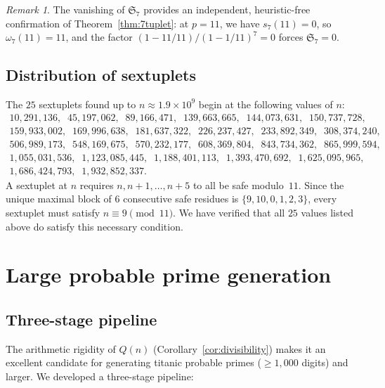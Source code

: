 \documentclass[11pt,a4paper]{article}
\theoremstyle{plain}
\theoremstyle{definition}
\theoremstyle{remark}
\newtheorem{remark}[theorem]{Remark}
\begin{document}
\begin{remark}
The vanishing of $\mathfrak{S}_7$ provides an independent, heuristic-free confirmation of Theorem~\ref{thm:7tuplet}: at $p = 11$, we have $s_7(11) = 0$, so $\omega_7(11) = 11$, and the factor $(1 - 11/11)/(1 - 1/11)^7 = 0$ forces $\mathfrak{S}_7 = 0$.
\end{remark}


\subsection{Distribution of sextuplets}

The $25$ sextuplets found up to $n \approx 1.9 \times 10^9$ begin at the following values of $n$:
\begin{gather*}
10{,}291{,}136,\;\; 45{,}197{,}062,\;\; 89{,}166{,}471,\;\; 139{,}663{,}665,\;\; 144{,}073{,}631,\;\; 150{,}737{,}728, \\
159{,}933{,}002,\;\; 169{,}996{,}638,\;\; 181{,}637{,}322,\;\; 226{,}237{,}427,\;\; 233{,}892{,}349,\;\; 308{,}374{,}240, \\
506{,}989{,}173,\;\; 548{,}169{,}675,\;\; 570{,}232{,}177,\;\; 608{,}369{,}804,\;\; 843{,}734{,}362,\;\; 865{,}999{,}594, \\
1{,}055{,}031{,}536,\;\; 1{,}123{,}085{,}445,\;\; 1{,}188{,}401{,}113,\;\; 1{,}393{,}470{,}692,\;\; 1{,}625{,}095{,}965, \\
1{,}686{,}424{,}793,\;\; 1{,}932{,}852{,}337.
\end{gather*}
A sextuplet at $n$ requires $n, n{+}1, \ldots, n{+}5$ to all be safe modulo~$11$. Since the unique maximal block of $6$ consecutive safe residues is $\{9, 10, 0, 1, 2, 3\}$, every sextuplet must satisfy $n \equiv 9 \pmod{11}$. We have verified that all $25$ values listed above do satisfy this necessary condition.


\section{Large probable prime generation}
\label{sec:large}

\subsection{Three-stage pipeline}

The arithmetic rigidity of $Q(n)$ (Corollary~\ref{cor:divisibility}) makes it an excellent candidate for generating titanic probable primes ($\ge 1{,}000$ digits) and larger. We developed a three-stage pipeline:
\end{document}
